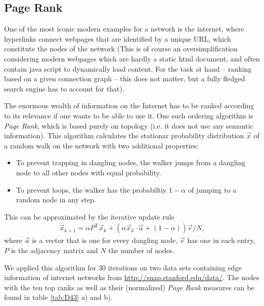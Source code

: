 \documentclass{scrartcl}
\begin{document}
\subsection{Page Rank}
One of the most iconic modern examples for a network is the internet, 
where hyperlinks connect webpages that are identified 
by a unique URL, which constitute the nodes of the network (This is of course
an oversimplification considering modern webpages which are hardly a static 
html document, and often contain java script to dynamically load content. For
the task at hand -- ranking based on a given connection graph -- this does not
matter, but a fully fledged search engine has to account for that).

The enormous wealth of information on the Internet has to be ranked according
to its relevance if one wants to be able to use it. One such ordering algorithm 
is \emph{Page Rank}, which is based purely on topology (i.e. it does not use 
any semantic information). This algorithm calculates the stationar probability 
distribution $\vec{x}$ of a random walk on the network with two additional properties:
\begin{itemize}
 \item To prevent trapping in dangling nodes, the walker jumps from a dangling node
		to all other nodes with equal probability.
 \item To prevent loops, the walker has the probabiltiy $1-\alpha$ of jumping to a random	
	node in any step.
\end{itemize}

This can be approximated by the iterative update rule
\begin{align}
	\vec{x}_{k+1} = \alpha P^\mathrm{T} \vec{x}_k + \left(\alpha \vec{x}_k \cdot \vec{a} + (1 - \alpha) \right) \vec{e}/N,
\end{align}
where $\vec{a}$ is a vector that is one for every dangling node, $\vec{e}$
has one in each entry, $P$ is the adjacency matrix and $N$ the number of
nodes.

We applied this algorithm for 30 iterations on two data sets containing
edge information of internet networks from
\url{http://snap.stanford.edu/data/}. The nodes with the ten top ranks as
well as their (normalized) \emph{Page Rank} measures can be found in table
\ref{tab:D43} a) and b).
\end{document}
